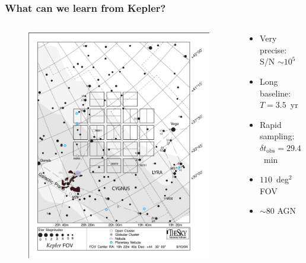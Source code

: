 \documentclass[hyperref={pdfpagelabels=false}]{beamer}
\begin{document}
\begin{frame}
\frametitle{What can we learn from Kepler?}
\begin{columns}
\centering
  \begin{column}{0.5\textwidth}
    \begin{figure}
      \includegraphics[scale=0.3]{images/Kepler_FOV.jpg}
    \end{figure}
      \centering
      {\tiny \citet{KIH}}
    \end{column}
    \begin{column}{0.5\textwidth}
        \begin{itemize}
        \item Very precise: S/N $\sim 10^{5}$
        \item Long baseline: $T = 3.5$~yr
        \item Rapid sampling: $\delta t_{\mathrm{obs}} = 29.4$~min
        \item $110$~deg$^{2}$ FOV
        \item $\sim 80$ AGN \\ {\tiny \citep{Mushotzky11,Edelson12,Carini12,Wehrle13,Shaya15}}
      \end{itemize}
    \end{column}
  \end{columns}
  \begin{center}
  \end{center}
\end{frame}
\end{document}
